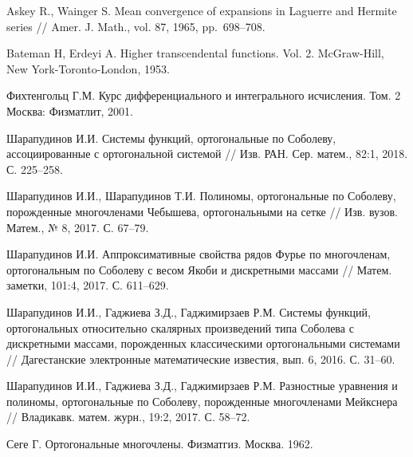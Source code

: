\documentclass[a4paper,12pt]{article}
\newenvironment{Rtwocolbib}
{%
\vspace*{3mm} %
\noindent
\def\bibname{}
\small
\vspace*{-12mm}%
\begin{thebibliography}{99}
\setlength{\itemsep}{-4pt}
}{%
\end{thebibliography}
\normalsize}%
\begin{document}
\begin{Rtwocolbib}
 {Askey R., Wainger S.} Mean convergence of expansions in Laguerre and Hermite series // Amer. J. Math., vol. 87, 1965, pp.~698--708.

 {Bateman H, Erdeyi A.} Higher transcendental functions. Vol. 2. McGraw-Hill, New York-Toronto-London, 1953.

 {Фихтенгольц Г.М.} Курс дифференциального и интегрального исчисления. Том. 2 Москва: Физматлит, 2001.

 {Шарапудинов И.И.} Системы функций, ортогональные по Соболеву, ассоциированные с ортогональной системой // Изв. РАН. Сер. матем., 82:1, 2018. С. 225--258.

 {Шарапудинов И.И., Шарапудинов Т.И.} Полиномы, ортогональные по Соболеву, порожденные многочленами Чебышева, ортогональными на сетке // Изв. вузов. Матем., № 8, 2017. С. 67--79.

 {Шарапудинов И.И.} Аппроксимативные свойства рядов Фурье по многочленам, ортогональным по Соболеву с весом Якоби и дискретными массами // Матем. заметки, 101:4, 2017. С. 611--629.

 {Шарапудинов И.И., Гаджиева З.Д., Гаджимирзаев Р.М.} Системы функций, ортогональных относительно скалярных произведений типа Соболева с дискретными массами, порожденных классическими ортогональными системами // Дагестанские электронные математические известия, вып. 6, 2016. С. 31--60. 

 {Шарапудинов И.И., Гаджиева З.Д., Гаджимирзаев Р.М.} Разностные уравнения и полиномы, ортогональные по Соболеву, порожденные многочленами Мейкснера // Владикавк. матем. журн., 19:2, 2017. С. 58--72.

 {Сеге Г.} Ортогональные многочлены. Физматгиз. Москва. 1962.

\end{Rtwocolbib}
\end{document}
